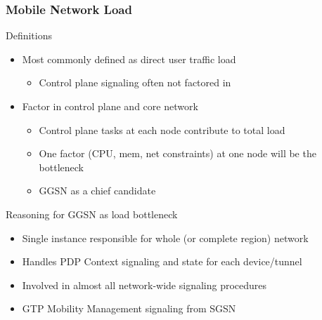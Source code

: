 \documentclass{beamer}
\begin{document}
\begin{frame}
	\frametitle{Mobile Network Load}
	
	Definitions
	\begin{itemize}
		\item Most commonly defined as direct user traffic load
			\begin{itemize}
				\item Control plane signaling often not factored in
			\end{itemize}

		\item Factor in control plane and core network
			\begin{itemize}
				\item Control plane tasks at each node contribute to total load
				\item One factor (CPU, mem, net constraints) at one node will be the bottleneck
				\item GGSN as a chief candidate
			\end{itemize}
	\end{itemize}

	\pause
	\vspace{1em}
	\begin{block}{Reasoning for GGSN as load bottleneck}
	\begin{itemize}
		\item Single instance responsible for whole (or complete region) network
		\item Handles PDP Context signaling and state for each device/tunnel
		\item Involved in almost all network-wide signaling procedures
		\item GTP Mobility Management signaling from SGSN
	\end{itemize}
	\end{block}


\end{frame}
\end{document}
